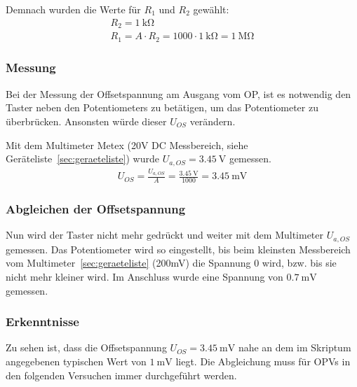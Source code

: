 Demnach wurden die Werte für $R_1$ und $R_2$ gewählt:
\begin{gather}
	R_2=\SI{1}{\kilo\ohm} \\
	R_1 = A \cdot R_2 = 1000 \cdot \SI{1}{\kilo\ohm} = \SI{1}{\mega\ohm}
\end{gather}

\subsubsection{Messung}

Bei der Messung der Offsetspannung am Ausgang vom OP, ist es notwendig den
Taster neben den Potentiometers zu betätigen, um das Potentiometer zu
überbrücken. Ansonsten würde dieser $U_{OS}$ verändern.

Mit dem Multimeter Metex (20V DC Messbereich, siehe Geräteliste~\ref{sec:geraeteliste}) wurde $U_{a,OS}=\SI{3.45}{\volt}$ gemessen.
\begin{gather}
	U_{OS} = \frac{U_{a,OS}}{A} = \frac{\SI{3.45}{\volt}}{1000} = \SI{3.45}{\milli\volt}
\end{gather}

\subsubsection{Abgleichen der Offsetspannung}

Nun wird der Taster nicht mehr gedrückt und weiter mit dem Multimeter
$U_{a,OS}$ gemessen. Das Potentiometer wird so eingestellt, bis beim kleinsten
Messbereich vom Multimeter~\ref{sec:geraeteliste} (200mV) die Spannung 0 wird,
bzw. bis sie nicht mehr kleiner wird. Im Anschluss wurde eine Spannung von $\SI{0.7}{\milli\volt}$ gemessen.

\subsubsection{Erkenntnisse}

Zu sehen ist, dass die Offsetspannung $U_{OS}=\SI{3.45}{\milli\volt}$ nahe an dem im
Skriptum angegebenen typischen Wert von $\SI{1}{\milli\volt}$ liegt. Die Abgleichung
muss für OPVs in den folgenden Versuchen immer durchgeführt werden.

